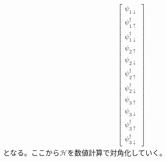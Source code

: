 \documentclass{jarticle}
\begin{document}
\begin{align}
\begin{bmatrix}
 \psi_{1\downarrow} \\ 
 \psi_{1\uparrow}^\dagger \\ 
 \psi_{1\downarrow}^\dagger \\ 
 \psi_{2\uparrow} \\ 
 \psi_{2\downarrow} \\ 
 \psi_{2\uparrow}^\dagger \\ 
 \psi_{2\downarrow}^\dagger \\ 
 \psi_{3\uparrow} \\ 
 \psi_{3\downarrow} \\ 
 \psi_{3\uparrow}^\dagger \\ 
 \psi_{3\downarrow}^\dagger
 \end{bmatrix} 
\end{align}
となる。ここから$\mathcal{H}$を数値計算で対角化していく。

\end{document}
